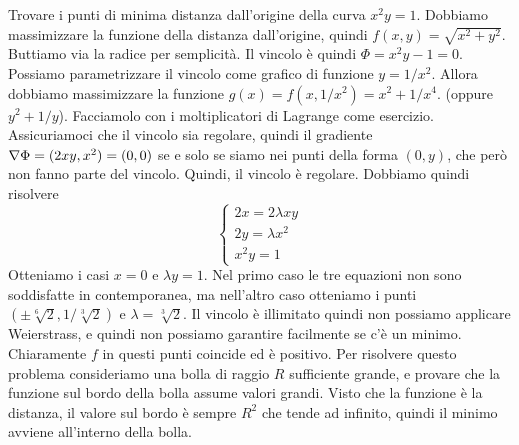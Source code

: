 \documentclass[a4paper]{article}
\begin{document}
\begin{snippetexercise}{}
    Trovare i punti di minima distanza dall'origine
    della curva \(x^2y = 1\).
    Dobbiamo massimizzare la funzione della distanza
    dall'origine, quindi \(f(x,y) = \sqrt{x^2 + y^2}\).
    Buttiamo via la radice per semplicità.
    Il vincolo è quindi \(\Phi = x^2 y - 1 = 0\).
    Possiamo parametrizzare il vincolo come grafico di funzione
    \(y = 1 / x^2\). Allora dobbiamo massimizzare la funzione \(g(x) = f(x, 1/x^2) = x^2 + 1/x^4\).
    (oppure \(y^2 + 1/y\)). Facciamolo con i moltiplicatori di Lagrange
    come esercizio. Assicuriamoci che il vincolo sia regolare, quindi il gradiente
    \(\nabla \Phi= (2xy, x^2) = (0,0)\) se e solo se siamo nei punti della forma \((0,y)\),
    che però non fanno parte del vincolo. Quindi, il vincolo è regolare.
    Dobbiamo quindi risolvere
    \[
        \begin{cases}
            2x = 2\lambda xy \\
            2y = \lambda x^2 \\
            x^2y = 1
        \end{cases}
    \]
    Otteniamo i casi \(x=0\) e \(\lambda y = 1\).
    Nel primo caso le tre equazioni non sono soddisfatte in contemporanea,
    ma nell'altro caso otteniamo i punti
    \((\pm \sqrt[6]{2}, 1 / \sqrt[3]{2})\) e \(\lambda = \sqrt[3]{2}\).
    Il vincolo è illimitato quindi non possiamo applicare Weierstrass,
    e quindi non possiamo garantire facilmente se c'è un minimo.
    Chiaramente \(f\) in questi punti coincide ed è positivo.
    Per risolvere questo problema consideriamo una bolla di raggio \(R\)
    sufficiente grande, e provare che la funzione sul bordo della bolla assume valori grandi.
    Visto che la funzione è la distanza, il valore sul bordo è sempre \(R^2\) che tende ad infinito,
    quindi il minimo avviene all'interno della bolla.
\end{snippetexercise}
\end{document}
